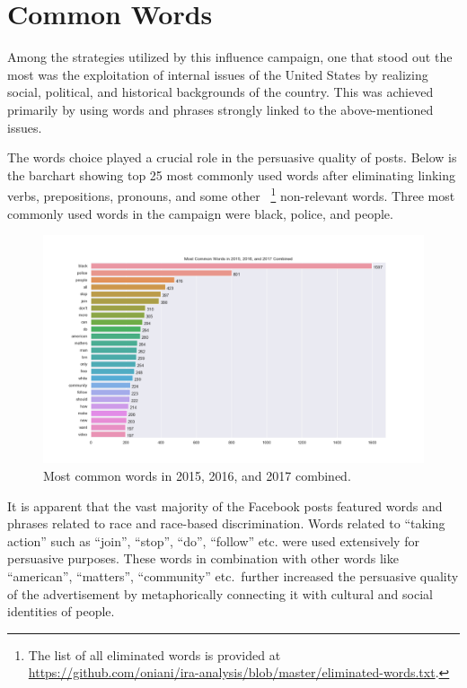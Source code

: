 \documentclass[12pt]{article}
\theoremstyle{definition}
\begin{document}

\section*{\centering Common Words}

Among the strategies utilized by this influence campaign, one that stood out
the most was the exploitation of internal issues of the United States by
realizing social, political, and historical backgrounds of the country.
This was achieved primarily by using words and phrases strongly linked to the
above-mentioned issues.

\bigskip

The words choice played a crucial role in the persuasive quality of posts.
Below is the barchart showing top 25 most commonly used words after eliminating
linking verbs, prepositions, pronouns, and some other
~\footnote{The list of all eliminated words is provided at\\
\url{https://github.com/oniani/ira-analysis/blob/master/eliminated-words.txt}.}
non-relevant words. Three most commonly used words in the campaign were black,
police, and people.

\begin{figure}[H]
\centering
\includegraphics[width=0.75\columnwidth]{./image/barchart-plots/barchart_word_counts.png}
\caption*{Most common words in 2015, 2016, and 2017 combined.}
\end{figure}

It is apparent that the vast majority of the Facebook posts featured words and
phrases related to race and race-based discrimination. Words related to
``taking action'' such as ``join'', ``stop'', ``do'', ``follow'' etc. were used
extensively for persuasive purposes. These words in combination with other words
like ``american'', ``matters'', ``community'' etc.~further increased the
persuasive quality of the advertisement by metaphorically connecting it with
cultural and social identities of people.
\end{document}
